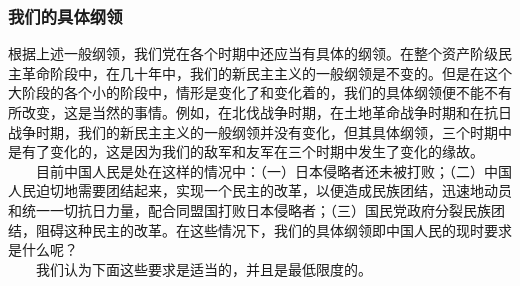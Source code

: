 \documentclass[cn,11pt,chinese]{elegantbook}
\def\myformat#1{\hfil\hfil #1}
\begin{document}
\subsubsection*{\myformat{我们的具体纲领}}
根据上述一般纲领，我们党在各个时期中还应当有具体的纲领。在整个资产阶级民主革命阶段中，在几十年中，我们的新民主主义的一般纲领是不变的。但是在这个大阶段的各个小的阶段中，情形是变化了和变化着的，我们的具体纲领便不能不有所改变，这是当然的事情。例如，在北伐战争时期，在土地革命战争时期和在抗日战争时期，我们的新民主主义的一般纲领并没有变化，但其具体纲领，三个时期中是有了变化的，这是因为我们的敌军和友军在三个时期中发生了变化的缘故。\\
　　目前中国人民是处在这样的情况中：（一）日本侵略者还未被打败；（二）中国人民迫切地需要团结起来，实现一个民主的改革，以便造成民族团结，迅速地动员和统一一切抗日力量，配合同盟国打败日本侵略者；（三）国民党政府分裂民族团结，阻碍这种民主的改革。在这些情况下，我们的具体纲领即中国人民的现时要求是什么呢？\\
　　我们认为下面这些要求是适当的，并且是最低限度的。\\
\end{document}
